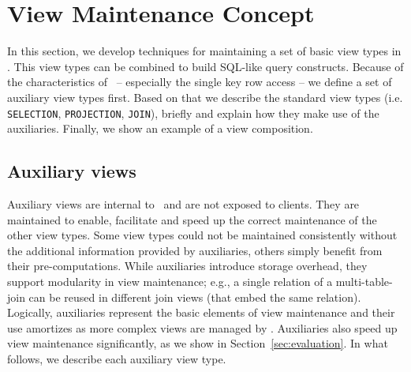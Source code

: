 \section{View Maintenance Concept} 
\label{sec:view_maintenance} 

In this section, we develop techniques for maintaining a set of
basic view types in \VMS. This view types can be combined to build
SQL-like query constructs. Because of the characteristics of
\KVS\ -- especially the single key row access -- we define a 
set of auxiliary view types first. Based on that
we describe the standard view types (i.e. \texttt{SELECTION}, 
\texttt{PROJECTION}, \texttt{JOIN}), briefly and explain how they make use
of the auxiliaries. Finally, we show an example of a view composition. 






\subsection{Auxiliary views}
\label{subsec:auxiliary_views}

Auxiliary views are internal to \VMS\ and are not exposed to
clients. They are maintained to enable, facilitate and speed up the
correct maintenance of the other view types. Some view types could not
be maintained consistently without the additional information provided
by auxiliaries, others simply benefit from their
pre-computations. While auxiliaries introduce storage overhead, they
support modularity in view maintenance; e.g., a single relation of a
multi-table-join can be reused in different join views (that embed the
same relation). Logically, auxiliaries represent the basic elements of
view maintenance and their use amortizes as more complex views are
managed by \VMS.  Auxiliaries also speed up view maintenance
significantly, as we show in Section~\ref{sec:evaluation}.  In what 
follows, we describe each auxiliary view type.

